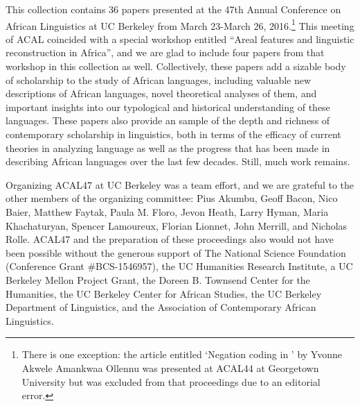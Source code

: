 \begin{refsection} 

This collection contains 36 papers presented at the 47th Annual Conference on African Linguistics at UC Berkeley from March 23-March 26, 2016.\footnote{There is one exception: the article entitled `Negation coding in ' by Yvonne Akwele Amankwaa Ollennu was presented at ACAL44 at Georgetown University but was excluded from that proceedings due to an editorial error.} This meeting of ACAL coincided with a special workshop entitled ``Areal features and linguistic reconstruction in Africa'', and we are glad to include four papers from that workshop in this collection as well. Collectively, these papers add a sizable body of scholarship to the study of African languages, including valuable new descriptions of African languages, novel theoretical analyses of them, and important insights into our typological and historical understanding of these languages. These papers also provide an sample of the depth and richness of contemporary scholarship in linguistics, both in terms of the efficacy of current theories in analyzing language as well as the progress that has been made in describing African languages over the last few decades. Still, much work remains.

Organizing ACAL47 at UC Berkeley was a team effort, and we are grateful to the other members of the organizing committee: Pius Akumbu, Geoff Bacon, Nico Baier, Matthew Faytak, Paula M. Floro, Jevon Heath, Larry Hyman, Maria Khachaturyan, Spencer Lamoureux, Florian Lionnet, John Merrill, and Nicholas Rolle. ACAL47 and the preparation of these proceedings also would not have been possible without the generous support of The National Science Foundation (Conference Grant \#BCS-1546957), the UC Humanities Research Institute, a UC Berkeley Mellon Project Grant, the Doreen B. Townsend Center for the Humanities, the UC Berkeley Center for African Studies, the UC Berkeley Department of Linguistics, and the Association of Contemporary African Linguistics.


\end{refsection}
